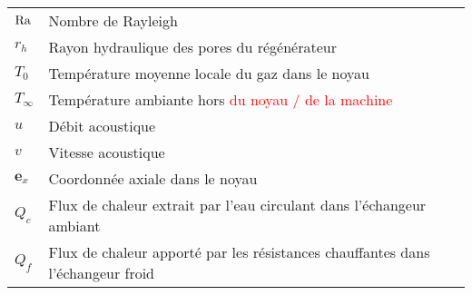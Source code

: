 \begin{center}
\begin{tabular}{p{} p{}}
        $\mathrm{Ra}$ & Nombre de Rayleigh \\
        $r_h$ & Rayon hydraulique des pores du régénérateur \\
        $T_0$ & Température moyenne locale du gaz dans le noyau \\
        $T_\infty$ & Température ambiante hors \textcolor{red}{du noyau / de la machine} \\
        $u$ & Débit acoustique \\
        $v$ & Vitesse acoustique \\
        $\mathbf{e}_x$ & Coordonnée axiale dans le noyau \\
        $Q_c$ & Flux de chaleur extrait par l'eau circulant dans l'échangeur ambiant \\
        $Q_f$ & Flux de chaleur apporté par les résistances chauffantes dans l'échangeur froid\\\hline
    \end{tabular}
\end{center}

\newpage

